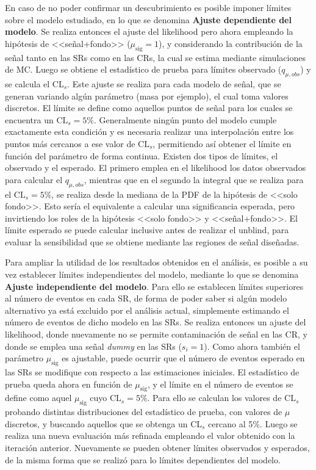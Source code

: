 En caso de no poder confirmar un descubrimiento es posible imponer límites sobre el modelo estudiado, en lo que se denomina \textbf{Ajuste dependiente del modelo}. 
Se realiza entonces el ajuste del likelihood pero ahora empleando la hipótesis de <<señal+fondo>> ($\mu_\text{sig}=1$), y considerando la contribución de la señal tanto en las SRs como en las CRs, la cual se estima mediante simulaciones de MC. Luego se obtiene el estadístico de prueba para límites observado ($q_{\mu, obs}$) y se calcula el $\text{CL}_{s}$. Este ajuste se realiza para cada modelo de señal, que se generan variando algún parámetro (masa por ejemplo), el cual toma valores discretos. El límite se define como aquellos puntos de señal para los cuales se encuentra un $\text{CL}_{s}=5\%$. Generalmente ningún punto del modelo cumple exactamente esta condición y es necesaria realizar una interpolación entre los puntos más cercanos a ese valor de $\text{CL}_{s}$, permitiendo así obtener el límite en función del parámetro de forma continua. Existen dos tipos de límites, el observado y el esperado. El primero emplea en el likelihood los datos observados para calcular el $q_{\mu, obs}$, mientras que en el segundo la integral que se realiza para el $\text{CL}_{s}=5\%$, se realiza desde la mediana de la PDF de la hipótesis de <<solo fondo>>. Esto sería el equivalente a calcular una significancia esperada, pero invirtiendo los roles de la hipótesis <<solo fondo>> y <<señal+fondo>>.
El límite esperado se puede calcular inclusive antes de realizar el unblind, para evaluar la sensibilidad que se obtiene mediante las regiones de señal diseñadas.

Para ampliar la utilidad de los resultados obtenidos en el análisis, es posible a su vez establecer límites independientes del modelo, mediante lo que se denomina \textbf{Ajuste independiente del modelo}. Para ello se establecen límites superiores al número de eventos en cada SR, de forma de poder saber si algún modelo alternativo ya está excluido por el análisis actual, simplemente estimando el número de eventos de dicho modelo en las SRs. Se realiza entonces un ajuste del likelihood, donde nuevamente no se permite contaminación de señal en las CR, y donde se emplea una señal \textit{dummy} en las SRs ($s_i=1$). Como ahora también el parámetro $\mu_\text{sig}$ es ajustable, puede ocurrir que el número de eventos esperado en las SRs se modifique con respecto a las estimaciones iniciales. El estadístico de prueba queda ahora en función de $\mu_\text{sig}$, y el límite en el número de eventos se define como aquel $\mu_\text{sig}$ cuyo $\text{CL}_{s}=5\%$. Para ello se calculan los valores de $\text{CL}_{s}$ probando distintas distribuciones del estadístico de prueba, con valores de $\mu$ discretos, y buscando aquellos que se obtenga un $\text{CL}_{s}$ cercano al 5\%. Luego se realiza una nueva evaluación más refinada empleando el valor obtenido con la iteración anterior. Nuevamente se pueden obtener límites observados y esperados, de la misma forma que se realizó para lo límites dependientes del modelo.

